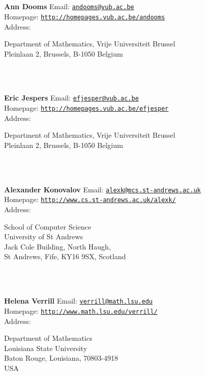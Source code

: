 \documentclass[a4paper,11pt]{report}
\begin{document}
\begin{titlepage}
\mbox{}\\
{\mbox{}\\
\small \noindent \textbf{Ann Dooms    }  Email: \href{mailto://andooms@vub.ac.be} {\texttt{andooms@vub.ac.be}}\\
  Homepage: \href{http://homepages.vub.ac.be/~andooms} {\texttt{http://homepages.vub.ac.be/\texttt{}andooms}}\\
  Address: \begin{minipage}[t]{8cm}\noindent
 Department of Mathematics, Vrije Universiteit Brussel\\
 Pleinlaan 2, Brussels, B-1050 Belgium \end{minipage}
}\\
{\mbox{}\\
\small \noindent \textbf{Eric Jespers    }  Email: \href{mailto://efjesper@vub.ac.be} {\texttt{efjesper@vub.ac.be}}\\
  Homepage: \href{http://homepages.vub.ac.be/~efjesper} {\texttt{http://homepages.vub.ac.be/\texttt{}efjesper}}\\
  Address: \begin{minipage}[t]{8cm}\noindent
 Department of Mathematics, Vrije Universiteit Brussel\\
 Pleinlaan 2, Brussels, B-1050 Belgium \end{minipage}
}\\
{\mbox{}\\
\small \noindent \textbf{Alexander Konovalov    }  Email: \href{mailto://alexk@mcs.st-andrews.ac.uk} {\texttt{alexk@mcs.st-andrews.ac.uk}}\\
  Homepage: \href{http://www.cs.st-andrews.ac.uk/~alexk/} {\texttt{http://www.cs.st-andrews.ac.uk/\texttt{}alexk/}}\\
  Address: \begin{minipage}[t]{8cm}\noindent
 School of Computer Science\\
 University of St Andrews\\
 Jack Cole Building, North Haugh,\\
 St Andrews, Fife, KY16 9SX, Scotland \end{minipage}
}\\
{\mbox{}\\
\small \noindent \textbf{Helena Verrill    }  Email: \href{mailto://verrill@math.lsu.edu} {\texttt{verrill@math.lsu.edu}}\\
  Homepage: \href{http://www.math.lsu.edu/~verrill/} {\texttt{http://www.math.lsu.edu/\texttt{}verrill/}}\\
  Address: \begin{minipage}[t]{8cm}\noindent
 Department of Mathematics\\
 Louisiana State University\\
 Baton Rouge, Louisiana, 70803-4918\\
 USA \end{minipage}
}\\
\end{titlepage}
\end{document}
